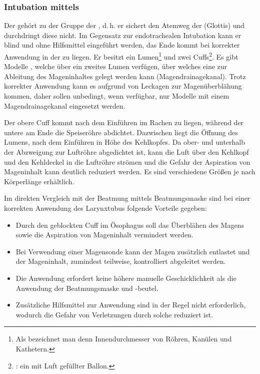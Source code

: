 \subsubsection{Intubation mittels }

{\label{topic:larynxtubus}
Der  
gehört zu der Gruppe der , d.\,h. er sichert den Atemweg 
 der  (Glottis) und durchdringt diese nicht. 
Im Gegensatz zur endotrachealen
Intubation kann er blind und ohne Hilfsmittel eingeführt
werden, das Ende kommt bei korrekter Anwendung in der
 zu liegen. Er besitzt ein
Lumen\footnote{Als  bezeichnet man denn
Innendurchmesser von Röhren, Kanülen und Kathetern.} und
zwei Cuffs\footnote{:
ein mit Luft gefüllter Ballon.}. Es gibt Modelle 
,
welche über ein zweites Lumen verfügen, über welches eine
 zur Ableitung des Mageninhaltes gelegt werden
kann (Magendrainagekanal). Trotz korrekter Anwendung kann es
aufgrund von Leckagen zur Magenüberblähung kommen, daher
sollen unbedingt, wenn verfügbar, nur Modelle mit einem
Magendrainagekanal eingesetzt werden.
\cite{Dengler2011,Mann2013}

Der obere Cuff kommt nach dem Einführen im Rachen zu
liegen, während der untere am Ende die Speiseröhre abdichtet.
Dazwischen liegt die Öffnung des Lumens, nach dem Einführen
in Höhe des Kehlkopfes. Da ober- und unterhalb der
Abzweigung zur Luftröhre abgedichtet ist, kann die Luft über
den Kehlkopf und den Kehldeckel in die Luftröhre strömen und
die Gefahr der Aspiration von Mageninhalt kann deutlich
reduziert werden. Es sind verschiedene Größen je nach
Körperlänge erhältlich.
\cite{Asai2005} %

Im direkten Vergleich mit der Beatmung mittels
Beatmungsmaske
sind bei einer korrekten Anwendung des Larynxtubus{\texttrademark} folgende
Vorteile gegeben:
\begin{itemize}
  \item Durch den geblockten Cuff im Ösophagus soll das Überblähen
  des Magens sowie die Aspiration von Mageninhalt
  vermindert werden.
  \item Bei Verwendung einer Magensonde 
  kann der Magen zusätzlich entlastet 
  und der Mageninhalt, 
  zumindest teilweise, 
  kontrolliert abgeleitet werden. 
  \item Die Anwendung erfordert keine höhere manuelle
  Geschicklichkeit als die Anwendung der Beatmungsmaske und
  -beutel.
  \item Zusätzliche Hilfsmittel zur Anwendung sind in der
  Regel nicht erforderlich, wodurch die Gefahr von
  Verletzungen durch solche reduziert ist.
\end{itemize}

}
